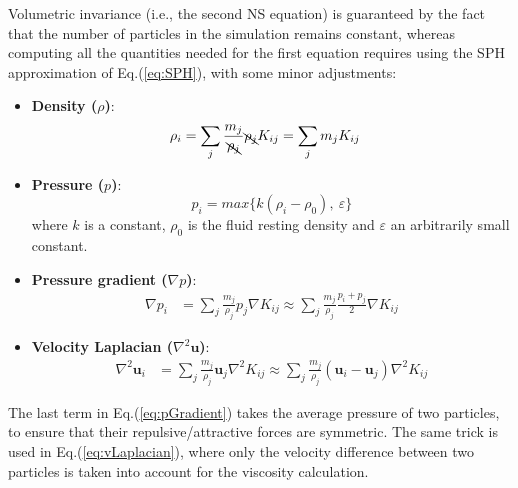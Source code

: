 Volumetric invariance (i.e., the second NS equation) is guaranteed by the fact that the number of particles in the simulation remains constant, whereas computing all the quantities needed for the first equation requires using the SPH approximation of Eq.(\ref{eq:SPH}), with some minor adjustments:
\begin{itemize}
    \item \textbf{Density ($\rho$)}: 
        \begin{align}
            \rho_i &= \sum_j{\frac{m_j}{\bcancel{\rho_j}} \bcancel{\rho_j} K_{ij}} = \sum_j{m_j K_{ij}} \label{eq:density}
        \end{align}
    \item \textbf{Pressure ($p$)}: 
        $$
            p_i = max\{k(\rho_i - \rho_0),\ \varepsilon\}
        $$
    where $k$ is a constant, $\rho_0$ is the fluid resting density and $\varepsilon$ an arbitrarily small constant.
    \item \textbf{Pressure gradient ($\nabla p$)}: 
        \begin{align}
            \nabla p_i &= \sum_j{\frac{m_j}{\rho_j}p_j \nabla K_{ij}} \approx \sum_j{\frac{m_j}{\rho_j}\frac{p_i + p_j}{2} \nabla K_{ij}} \label{eq:pGradient}
        \end{align}
    \item \textbf{Velocity Laplacian ($\nabla^2 \textbf{u}$)}: 
        \begin{align}
            \nabla^2 \textbf{u}_i &= \sum_j{\frac{m_j}{\rho_j}\textbf{u}_j \nabla^2 K_{ij}} \approx \sum_j{\frac{m_j}{\rho_j}(\textbf{u}_i - \textbf{u}_j) \nabla^2 K_{ij}}\label{eq:vLaplacian}
        \end{align}
\end{itemize}

\noindent
The last term in Eq.(\ref{eq:pGradient}) takes the average pressure of two particles, to ensure that their repulsive/attractive forces are symmetric. The same trick is used in Eq.(\ref{eq:vLaplacian}), where only the velocity difference between two particles is taken into account for the viscosity calculation.